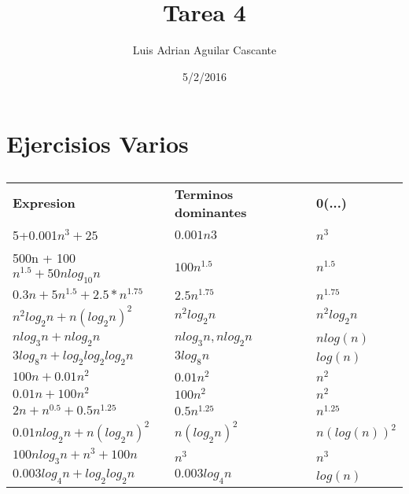\documentclass[11pt]{article}
\title{\textbf{Tarea 4}}
\author{Luis Adrian Aguilar Cascante\\
		}
\date{5/2/2016}
\begin{document}
\maketitle

\section{Ejercisios Varios}
\subsection{}
\subsection{}
\subsection{}
\subsection{}
\begin{spacing}{1.75}
\begin{tabular}{p{5cm}p{5cm}p{5cm}}
\textbf{Expresion} & \textbf{Terminos dominantes} & \textbf{0(...)}\\
5+0.001$n^3+25$ & $0.001n3$ & $n^3$\\
500n + 100$n^{1.5}+50nlog_{10}n$ & $100n^1.5$ & $n^{1.5}$\\
$0.3n+5n^{1.5}+2.5*n^{1.75}$&$2.5n^{1.75}$ & $n^{1.75}$ \\
$n^{2}log_{2}n+n(log_{2}n)^{2}$& $n^2log_2n$ & $n^2log_2n$ \\
$nlog_{3}n+nlog_{2}n$& $nlog_3n,nlog_2n$ & $nlog(n)$  \\
$3log_{8}n+log_{2}log_{2}log_{2}n$& $3log_8n$ & $log(n)$  \\
$100n+0.01n^{2}$& $0.01n^2$ & $n^2$  \\
$0.01n+100n^2$& $100n^2$ & $n^2$ \\
$2n+n^{0.5}+0.5n^{1.25}$ & $0.5n^{1.25}$ & $n^{1.25}$\\
$0.01nlog_2n+n(log_2n)^2$& $n(log_2n)^2$ & $n(log(n))^2$  \\

$100nlog_3n+n^3+100n$& $n^3$ & $n^3$ \\
$0.003log_4n+log_2log_2n$ & $0.003log_4n$ & $log(n)$ \\

\end{tabular}
\end{spacing}
\end{document}
